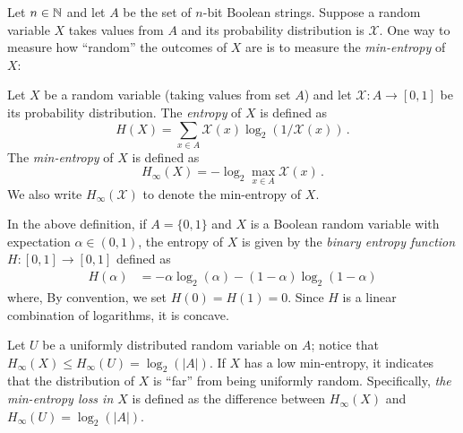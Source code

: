 Let $n \in \mathbb{N}$ and let $A$ be the set of $n$-bit Boolean strings.
Suppose a random variable $X$ takes values from $A$
and its probability distribution is $\mathcal{X}$. 
One way to measure how ``random'' the outcomes of $X$ are 
is to measure the \emph{min-entropy} of $X$:

\begin{definition}
    Let $X$ be a random variable (taking values from set $A$) 
    and let $\mathcal{X} : A \rightarrow [0,1]$ be its probability distribution.
    The \emph{entropy} of $X$ is defined as 
    \begin{equation}\label{def:entropy}
        H(X) = \sum_{x \in A} \mathcal{X}(x) \log_2 (1/\mathcal{X}(x))
        \,.
    \end{equation}
    The \emph{min-entropy} of $X$ is defined as 
    \begin{equation}\label{def:min-entropy}
        H_\infty(X) = - \log_2 \max_{x \in A} \mathcal{X}(x)
        \,.
    \end{equation}
    We also write $H_\infty(\mathcal{X})$ to denote the min-entropy of $X$.
\end{definition}
\noindent

In the above definition, 
if $A = \{0,1\}$ and $X$ is a Boolean random variable with expectation $\alpha \in (0,1)$, 
the entropy of $X$ is given by 
the \emph{binary entropy function} $H: [0,1] \rightarrow [0,1]$ defined as 
\begin{align}\label{eq:binary-entropy}
    H(\alpha) &= -\alpha \log_2(\alpha) - (1-\alpha) \log_2(1-\alpha)
\end{align}
where, By convention, we set $H(0) = H(1) = 0$. 
Since $H$ is a linear combination of logarithms, it is concave. 

Let $U$ be a uniformly distributed random variable on $A$; 
notice that $H_\infty(X) \leq H_\infty(U) = \log_2(|A|)$. 
If $X$ has a low min-entropy, 
it indicates that the distribution of $X$ is ``far'' from being uniformly random. 
Specifically, \emph{the min-entropy loss in $X$} 
is defined as the difference between $H_\infty(X)$ and $H_\infty(U) = \log_2(|A|)$.


